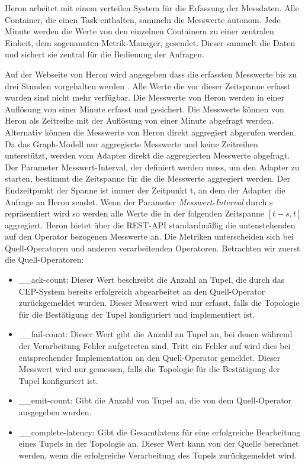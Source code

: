Heron arbeitet mit einem verteilen System für die Erfassung der Messdaten.
Alle Container, die einen Task enthalten, sammeln die Messwerte autonom.
Jede Minute werden die Werte von den einzelnen Containern zu einer zentralen Einheit, dem sogenannten Metrik-Manager, gesendet.
Dieser sammelt die Daten und sichert sie zentral für die Bedienung der Anfragen.

Auf der Webseite von Heron wird angegeben dass die erfassten Messwerte bis zu drei Stunden vorgehalten werden \cite{noauthor_heron_nodate}.
Alle Werte die vor dieser Zeitspanne erfasst wurden sind nicht mehr verfügbar.
Die Messwerte von Heron werden in einer Auflösung von einer Minute erfasst und gesichert.
Die Messwerte können von Heron als Zeitreihe mit der Auflösung von einer Minute abgefragt werden.
Alternativ können die Messwerte von Heron direkt aggregiert abgerufen werden.
Da das Graph-Modell nur aggregierte Messwerte und keine Zeitreihen unterstützt, werden vom Adapter direkt die aggregierten Messwerte abgefragt.
Der Parameter Messwert-Interval, der definiert werden muss, um den Adapter zu starten, bestimmt die Zeitspanne für die die Messwerte aggregiert werden.
Der Endzeitpunkt der Spanne ist immer der Zeitpunkt t, an dem der Adapter die Anfrage an Heron sendet.
Wenn der Parameter \textit{Messwert-Interval} durch s repräsentiert wird so werden alle Werte die in der folgenden Zeitspanne \([t-s, t]\) aggregiert.
Heron bietet über die REST-API standardmäßig die untenstehenden auf den Operator bezogenen Messwerte an.
Die Metriken unterscheiden sich bei Quell-Operatoren und anderen verarbeitenden Operatoren.
Betrachten wir zuerst die Quell-Operatoren:

\begin{itemize}
\item{\_\_ack-count: Dieser Wert beschreibt die Anzahl an Tupel, die durch das CEP-System bereits erfolgreich abgearbeitet an den Quell-Operator zurückgemeldet wurden. 
Dieser Messwert wird nur erfasst, falls die Topologie für die Bestätigung der Tupel konfiguriert und implementiert ist.}

\item{\_\_fail-count: Dieser Wert gibt die Anzahl an Tupel an, bei denen während der Verarbeitung Fehler aufgetreten sind. Tritt ein Fehler auf wird dies bei entsprechender Implementation an den Quell-Operator gemeldet. Dieser Messwert wird nur gemessen, falls die Topologie für die Bestätigung der Tupel konfiguriert ist.}

\item{\_\_emit-count: Gibt die Anzahl von Tupel an, die von dem Quell-Operator ausgegeben wurden.}

\item{\_\_complete-latency: Gibt die Gesamtlatenz für eine erfolgreiche Bearbeitung eines Tupels in der Topologie an. Dieser Wert kann von der Quelle berechnet werden, wenn die erfolgreiche Verarbeitung des Tupels zurückgemeldet wird.}

\end{itemize}

